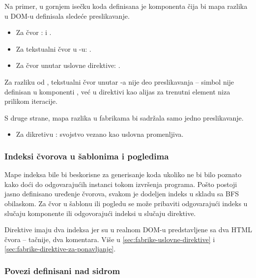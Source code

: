 Na primer, u gornjem isečku koda definisana je komponenta čija bi mapa razlika u DOM-u definisala sledeće preslikavanje.

\begin{itemize}
  \item Za čvor :  i .
  \item Za tekstualni čvor u -u: .
  \item Za čvor  unutar uslovne direktive: .
\end{itemize}

Za razliku od , tekstualni čvor  unutar -a nije deo preslikavanja -- simbol  nije definisan u komponenti , već u direktivi  kao alijas za trenutni element niza  prilikom iteracije.

S druge strane, mapa razlika u fabrikama bi sadržala samo jedno preslikavanje.

\begin{itemize}
  \item Za dikretivu : svojstvo  vezano kao uslovna promenljiva.
\end{itemize}

\subsubsection{Indeksi čvorova u šablonima i pogledima}\label{sec:getIndexesFor}\label{sec:getSingleIndexFor}

Mape indeksa bile bi beskorisne za generisanje koda ukoliko ne bi bilo poznato kako doći do odgovarajućih instanci tokom izvršenja programa.
Pošto postoji jasno definisano uređenje čvorova, svakom je dodeljen indeks u skladu sa BFS obilaskom.
Za čvor u šablonu ili pogledu se može pribaviti odgovarajući indeks u slučaju komponente ili odgovorajući indeksi u slučaju direktive.

Direktive imaju dva indeksa jer su u realnom DOM-u predstavljene sa dva HTML čvora -- tačnije, dva komentara.
Više u \cref{sec:fabrike-uslovne-direktive} i \cref{sec:fabrike-direktive-za-ponavljanje}.

\subsubsection{Povezi definisani nad sidrom}\label{sec:getSelfBindings}

